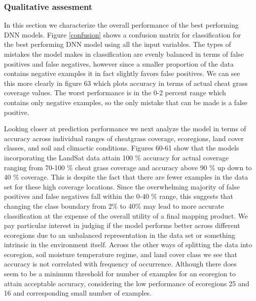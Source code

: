 \def\year{2017}\relax \documentclass[letterpaper]{article}
\begin{document}
\subsubsection{Qualitative assesment}
In this section we characterize the overall performance of the best performing DNN models. Figure \ref{confusion} shows a confusion matrix for classification for the best performing DNN model using all the input variables. The types of mistakes the model makes in classification are evenly balanced in terms of false positives and false negatives, however since a smaller proportion of the data contains negative examples it in fact slightly favors false positives. We can see this more clearly in figure 63 which plots accuracy in terms of actual cheat grass coverage values. The worst performance is in the 0-2 percent range which contains only negative examples, so the only mistake that can be made is a false positive. 

Looking closer at prediction performance
we next analyze the model  in terms of accuracy across individual ranges of cheatgrass coverage, ecoregions, land cover classes, and soil and climactic conditions. 
Figures 60-61 show that the models incorporating the LandSat data attain 100 \% accuracy for actual coverage ranging from 70-100 \% cheat grass coverage and accuracy above 90 \% up down to 40 \% coverage. This is despite the fact that there are fewer examples in the data set for these high coverage locations. Since the overwhelming majority of false positives and false negatives fall within the 0-40 \% range, this suggests that changing the class boundary from 2\% to 40\% may lead to more accurate classification at the expense of the overall utility of a final mapping product.
We pay particular interest in judging if the model performs better across different ecoregions due to an unbalanced representation in the data set or something intrinsic in the environment itself.  
Across the other ways of splitting the data into ecoregion, soil moisture temperature regime, and land cover class we see that accuracy is not correlated with frequency of occurrence. Although there does seem to be a minimum threshold for number of examples for an ecoregion to attain acceptable accuracy, considering the low performance of ecoregions 25 and 16 and corresponding small number of examples.  
\end{document}
